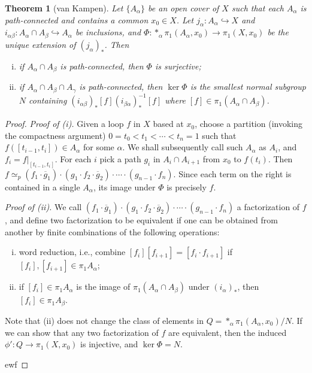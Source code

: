 \documentclass[11pt]{article}
\theoremstyle{definition}
\theoremstyle{plain}
\newtheorem{theorem}{Theorem}
\theoremstyle{remark}
\begin{document}
\begin{theorem}[van Kampen]
Let $\{A_\alpha\}$ be an open cover of $X$ such that each $A_\alpha$ is path-connected and contains a common $x_0\in X$. Let $j_\alpha:A_\alpha\hookrightarrow X$ and $i_{\alpha\beta}:A_\alpha\cap A_\beta\hookrightarrow A_\alpha$ be inclusions, and $\Phi:\ast_\alpha\pi_1(A_\alpha,x_0)\to\pi_1(X,x_0)$ be the unique extension of $(j_\alpha)_\ast$. Then\begin{enumerate}[(i)]
    \item if $A_\alpha\cap A_\beta$ is path-connected, then $\Phi$ is surjective;
    \item if $A_\alpha\cap A_\beta\cap A_\gamma$ is path-connected, then $\ker\Phi$ is the smallest normal subgroup $N$ containing $(i_{\alpha\beta})_\ast[f](i_{\beta\alpha})_\ast^{-1}[f]$ where $[f]\in\pi_1(A_\alpha\cap A_\beta)$.
\end{enumerate}
\end{theorem}
\begin{proof}
\textit{Proof of (i).} Given a loop $f$ in $X$ based at $x_0$, choose a partition (invoking the compactness argument) $0=t_0<t_1<\cdots<t_n=1$ such that $f([t_{i-1},t_i])\in A_\alpha$ for some $\alpha$. We shall subsequently call such $A_\alpha$ as $A_i$, and $f_i=f|_{[t_{i-1},t_i]}$. For each $i$ pick a path $g_i$ in $A_i\cap A_{i+1}$ from $x_0$ to $f(t_i)$. Then $f\simeq_p(f_1\cdot\overline{g}_1)\cdot(g_1\cdot f_2\cdot\overline{g}_2)\cdot\cdots\cdot(g_{n-1}\cdot f_n)$. Since each term on the right is contained in a single $A_\alpha$, its image under $\Phi$ is precisely $f$.\medbreak

\textit{Proof of (ii).} We call $(f_1\cdot\overline{g}_1)\cdot(g_1\cdot f_2\cdot\overline{g}_2)\cdot\cdots\cdot(g_{n-1}\cdot f_n)$ a factorization of $f$, and define two factorization to be equivalent if one can be obtained from another by finite combinations of the following operations:\begin{enumerate}[(i)]
    \item word reduction, i.e., combine $[f_i][f_{i+1}]=[f_i\cdot f_{i+1}]$ if $[f_i],[f_{i+1}]\in\pi_1A_\alpha$;
    \item if $[f_i]\in\pi_1A_\alpha$ is the image of $\pi_1(A_\alpha\cap A_\beta)$ under $(i_\alpha)_\ast$, then $[f_i]\in\pi_1A_\beta$.
\end{enumerate}
Note that (ii) does not change the class of elements in $Q=\ast_\alpha\pi_1(A_\alpha,x_0)/N$. If we can show that any two factorization of $f$ are equivalent, then the induced $\phi':Q\to\pi_1(X,x_0)$ is injective, and $\ker\Phi=N$.\medbreak

ewf
\end{proof}
\end{document}
